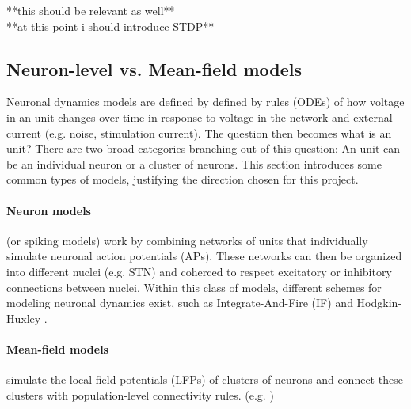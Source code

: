 **this should be relevant as well** \cite{schwab2020spike} \\
**at this point i should introduce STDP**

\subsection{Neuron-level vs. Mean-field models}
Neuronal dynamics models are defined by defined by rules (ODEs) of how voltage in an unit changes
over time in response to voltage in the network and external current (e.g. noise, stimulation
current).
The question then becomes what is an unit? There are two broad categories branching out of this
question: An unit can be an individual neuron or a cluster of neurons. This section introduces
some common types of models, justifying the direction chosen for this project.

\paragraph{Neuron models} (or spiking models) work by combining networks of units that individually
simulate neuronal action potentials (APs).
These networks can then be organized into different nuclei (e.g. STN) and coherced to respect
excitatory or inhibitory connections between nuclei.
Within this class of models, different schemes for modeling neuronal dynamics exist,
such as Integrate-And-Fire (IF) \cite{gerstner2014if} and Hodgkin-Huxley
\cite{hodgkin1952measurement, gerstner2014hh}.

\paragraph{Mean-field models} simulate the local field potentials (LFPs) of clusters of neurons
and connect these clusters with population-level connectivity rules. (e.g.
\cite{jansen1995electroencephalogram})

